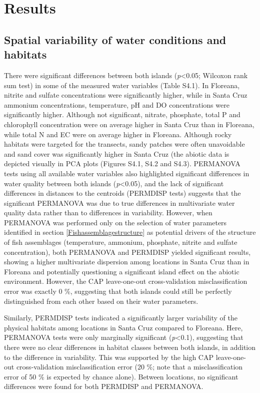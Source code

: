 \section{Results}
\label{Results}

\subsection{Spatial variability of water conditions and habitats}

There were significant differences between both islands (\textit{p}<0.05; Wilcoxon rank sum test) in some of the measured water variables (Table S4.1). In Floreana, nitrite and sulfate concentrations were significantly higher, while in Santa Cruz ammonium concentrations, temperature, pH and DO concentrations were significantly higher. Although not significant, nitrate, phosphate, total P and chlorophyll concentration were on average higher in Santa Cruz than in Floreana, while total N and EC were on average higher in Floreana. Although rocky habitats were targeted for the transects, sandy patches were often unavoidable and sand cover was significantly higher in Santa Cruz (the abiotic data is depicted visually in PCA plots (Figures S4.1, S4.2 and S4.3). PERMANOVA tests using all available water variables also highlighted significant differences in water quality between both islands (\textit{p}<0.05), and the lack of significant differences in distances to the centroids (PERMDISP tests) suggests that the significant PERMANOVA was due to true differences in multivariate water quality data rather than to differences in variability. However, when PERMANOVA was performed only on the selection of water parameters identified in section \ref{Fishassemblagestructure} as potential drivers of the structure of fish assemblages (temperature, ammonium, phosphate, nitrite and sulfate concentration), both PERMANOVA and PERMDISP yielded significant results, showing a higher multivariate dispersion among locations in Santa Cruz than in Floreana and potentially questioning a significant island effect on the abiotic environment. However, the CAP leave-one-out cross-validation misclassification error was exactly 0 \%, suggesting that both islands could still be perfectly distinguished from each other based on their water parameters. 

Similarly, PERMDISP tests indicated a significantly larger variability of the physical habitats among locations in Santa Cruz compared to Floreana. Here, PERMANOVA tests were only marginally significant (\textit{p}<0.1), suggesting that there were no clear differences in habitat classes between both islands, in addition to the difference in variability. This was supported by the high CAP leave-one-out cross-validation misclassification error (20 \%; note that a misclassification error of 50 \% is expected by chance alone). Between locations, no significant differences were found for both PERMDISP and PERMANOVA.

